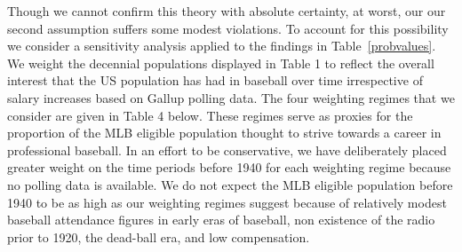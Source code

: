 \documentclass[11pt]{article}\usepackage[]{graphicx}\usepackage[]{color}
\begin{document}
Though we cannot confirm this theory with absolute certainty, at worst, our 
our second assumption suffers some modest violations.  
To account for this possibility we consider a sensitivity 
analysis applied to the findings in Table~\ref{probvalues}.  We weight the 
decennial populations displayed in Table 1 to reflect the overall interest 
that the US population has had in baseball over time irrespective of salary 
increases based on Gallup polling data.  
The four weighting regimes that we consider 
are given in Table 4 below.  %
These regimes serve as proxies for the proportion of the 
MLB eligible population thought to strive towards a career in professional 
baseball.  
In an effort to be conservative, we have deliberately placed greater weight 
on the time periods before 1940 for each weighting regime because no polling 
data is available.
We do not expect the MLB eligible population before 1940 to be as 
high as our weighting regimes suggest because of 
relatively modest baseball attendance figures in early eras of baseball,  
non existence of the radio prior to 1920, 
the dead-ball era,
and low compensation.  



\end{document}
